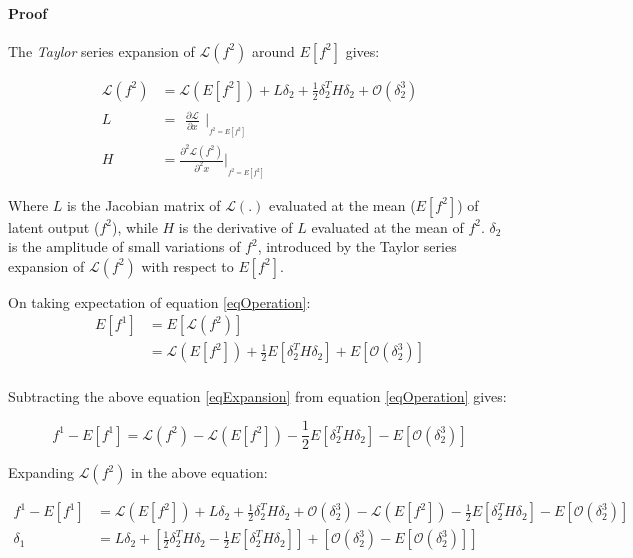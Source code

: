 \paragraph{Proof} The \textit{Taylor} series expansion of $\mathcal{L}\left ( f^{2}\right )$ around $E[f^2]$ gives:

\begin{equation}
\begin{aligned}
\mathcal{L}\left ( f^{2}\right ) & = \mathcal{L}\left ( E[f^2]\right ) + L\delta_2 + \frac{1}{2} \delta_2^T H \delta_2 + \mathcal{O}(\delta_2^3) \\
L & = \begin{matrix}
\frac{\partial \mathcal{L}}{\partial x} 
\end{matrix}|_{_{f^{2} = E[f^2]}} \\
H & = \frac{\partial^2 \mathcal{L}(f^2)}{\partial^2 x} 
|_{_{f^{2} = E[f^2]}}
\end{aligned}
\end{equation}


Where $L$ is the Jacobian matrix of \(\mathcal{L}\left ( . \right )\) evaluated at the mean ($E[f^2]$) of latent output (\(f^{2}\)), while $H$ is the derivative of $L$ evaluated at the mean of $f^2$. \(\delta_2\) is the amplitude of small variations of \(f^{2}\), introduced by the Taylor series expansion of \(\mathcal{L}(f^2)\) with respect to \(E[f^{2}]\).

On taking expectation of equation \ref{eqOperation}:
\begin{equation}
\begin{aligned}
    E[f^1]  & = E[\mathcal{L}(f^2)] \\
            & = \mathcal{L}(E[f^2]) + \frac{1}{2} E[\delta_2^T H \delta_2] + E[\mathcal{O}(\delta_2^3)] \label{eqExpansion}\\
\end{aligned}
\end{equation}

Subtracting the above equation \ref{eqExpansion} from equation \ref{eqOperation} gives:

\begin{equation}
    f^1 - E[f^1] = \mathcal{L}(f^2) - \mathcal{L}(E[f^2]) - \frac{1}{2} E[\delta_2^T H \delta_2] - E[\mathcal{O}(\delta_2^3)]
\end{equation}

Expanding $\mathcal{L}(f^2)$ in the above equation:

\begin{align}\label{eqBaseEquation}
    f^1 - E[f^1] & = \mathcal{L}\left ( E[f^2]\right ) + L\delta_2 + \frac{1}{2} \delta_2^T H \delta_2 + \mathcal{O}(\delta_2^3) - \mathcal{L}(E[f^2]) - \frac{1}{2} E[\delta_2^T H \delta_2] - E[\mathcal{O}(\delta_2^3)] \\
    \delta_1 & = L\delta_2 + \left [\frac{1}{2} \delta_2^T H \delta_2 - \frac{1}{2} E[\delta_2^T H \delta_2]\right ] + \left [ \mathcal{O}(\delta_2^3)   - E[\mathcal{O}(\delta_2^3)]\right ]
\end{align}

